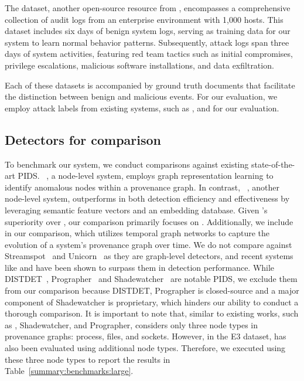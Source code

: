 The \optc dataset, another open-source resource from \darpa, encompasses a comprehensive collection of audit logs from an enterprise environment with 1,000 hosts. This dataset includes six days of benign system logs, serving as training data for our system to learn normal behavior patterns. Subsequently, attack logs span three days of system activities, featuring red team tactics such as initial compromises, privilege escalations, malicious software installations, and data exfiltration.

Each of these datasets is accompanied by ground truth documents that facilitate the distinction between benign and malicious events. For our evaluation, we employ attack labels from existing systems, such as \threatrace, \kairos and \flash for our evaluation.

\subsection{Detectors for comparison}

To benchmark our system, we conduct comparisons against existing state-of-the-art PIDS. \threatrace~\cite{wang2022threatrace}, a node-level system, employs graph representation learning to identify anomalous nodes within a provenance graph. In contrast, \flash~\cite{flash2024}, another node-level system, outperforms \threatrace in both detection efficiency and effectiveness by leveraging semantic feature vectors and an embedding database. Given \flash's superiority over \threatrace, our comparison primarily focuses on \flash. Additionally, we include \kairos~\cite{cheng2023kairos} in our comparison, which utilizes temporal graph networks to capture the evolution of a system's provenance graph over time. We do not compare against Streamspot~\cite{streamspot} and Unicorn~\cite{han2020unicorn} as they are graph-level detectors, and recent systems like \threatrace and \flash have been shown to surpass them in detection performance. While DISTDET~\cite{dong2023distdet}, Prographer~\cite{yangprographer} and Shadewatcher~\cite{shadewatcher} are notable PIDS, we exclude them from our comparison because DISTDET, Prographer is closed-source and a major component of Shadewatcher is proprietary, which hinders our ability to conduct a thorough comparison. It is important to note that, similar to existing works, such as \kairos, Shadewatcher, and Prographer, \Sys considers only three node types in provenance graphs: process, files, and sockets. However, in the E3 dataset, \flash has also been evaluated using additional node types. Therefore, we executed \flash using these three node types to report the results in Table~\ref{summary:benchmarks:large}. 

